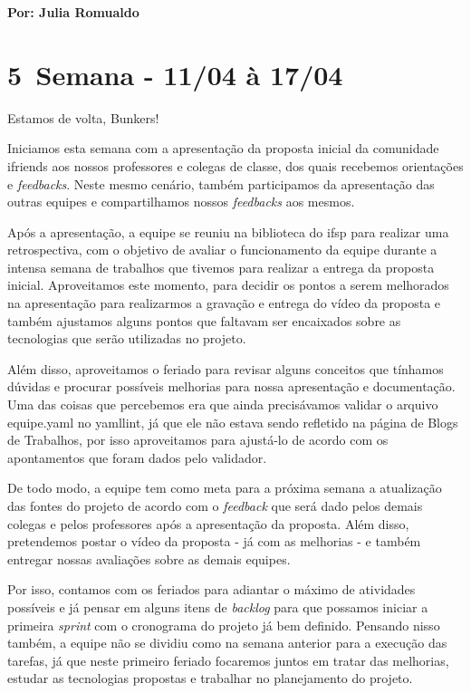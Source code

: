 \textbf{Por: Julia Romualdo} 

\section{5\textordfeminine \, Semana - 11/04 à 17/04}
 Estamos de volta, Bunkers!

Iniciamos esta semana com a apresentação da proposta inicial da comunidade \gls{ifriends} aos nossos professores e colegas de classe, dos quais recebemos orientações e \textsl{feedbacks}. Neste mesmo cenário, também participamos da apresentação das outras equipes e compartilhamos nossos \textsl{feedbacks} aos mesmos.

Após a apresentação, a equipe se reuniu na biblioteca do \acs{ifsp} para realizar uma retrospectiva, com o objetivo de avaliar o funcionamento da equipe durante a intensa semana de trabalhos que tivemos para realizar a entrega da proposta inicial. Aproveitamos este momento, para decidir os pontos a serem melhorados na apresentação para realizarmos a gravação e entrega do vídeo da proposta e também ajustamos alguns pontos que faltavam ser encaixados sobre as tecnologias que serão utilizadas no projeto.

Além disso, aproveitamos o feriado para revisar alguns conceitos que tínhamos dúvidas e procurar possíveis melhorias para nossa apresentação e documentação. Uma das coisas que percebemos era que ainda precisávamos validar o arquivo equipe.yaml no yamllint, já que ele não estava sendo refletido na página de Blogs de Trabalhos, por isso aproveitamos para ajustá-lo de acordo com os apontamentos que foram dados pelo validador.

De todo modo, a equipe tem como meta para a próxima semana a atualização das fontes do projeto de acordo com o \textsl{feedback} que será dado pelos demais colegas e pelos professores após a apresentação da proposta. Além disso, pretendemos postar o vídeo da proposta - já com as melhorias - e também entregar nossas avaliações sobre as demais equipes.

Por isso, contamos com os feriados para adiantar o máximo de atividades possíveis e já pensar em alguns itens de \textsl{backlog} para que possamos iniciar a primeira \textsl{sprint} com o cronograma do projeto já bem definido. Pensando nisso também, a equipe não se dividiu como na semana anterior para a execução das tarefas, já que neste primeiro feriado focaremos juntos em tratar das melhorias, estudar as tecnologias propostas e trabalhar no planejamento do projeto.

